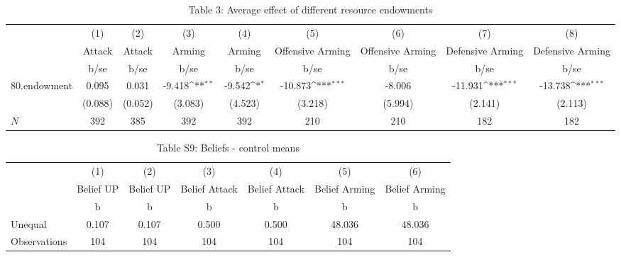 \begin{table}[htbp]\centering
\def\sym#1{\ifmmode^{#1}\else\(^{#1}\)\fi}
\caption{Table 3: Average effect of different resource endowments}
\begin{tabular}{l*{8}{c}}
\hline\hline
            &\multicolumn{1}{c}{(1)}&\multicolumn{1}{c}{(2)}&\multicolumn{1}{c}{(3)}&\multicolumn{1}{c}{(4)}&\multicolumn{1}{c}{(5)}&\multicolumn{1}{c}{(6)}&\multicolumn{1}{c}{(7)}&\multicolumn{1}{c}{(8)}\\
            &\multicolumn{1}{c}{Attack}&\multicolumn{1}{c}{Attack}&\multicolumn{1}{c}{Arming}&\multicolumn{1}{c}{Arming}&\multicolumn{1}{c}{Offensive Arming}&\multicolumn{1}{c}{Offensive Arming}&\multicolumn{1}{c}{Defensive Arming}&\multicolumn{1}{c}{Defensive Arming}\\
            &        b/se         &        b/se         &        b/se         &        b/se         &        b/se         &        b/se         &        b/se         &        b/se         \\
\hline
80.endowment&       0.095         &       0.031         &      -9.418\sym{**} &      -9.542\sym{*}  &     -10.873\sym{***}&      -8.006         &     -11.931\sym{***}&     -13.738\sym{***}\\
            &     (0.088)         &     (0.052)         &     (3.083)         &     (4.523)         &     (3.218)         &     (5.994)         &     (2.141)         &     (2.113)         \\
\hline
\(N\)       &         392         &         385         &         392         &         392         &         210         &         210         &         182         &         182         \\
\hline\hline
\end{tabular}
\end{table}
\begin{table}[htbp]\centering
\def\sym#1{\ifmmode^{#1}\else\(^{#1}\)\fi}
\caption{Table S9: Beliefs - control means}
\begin{tabular}{l*{6}{c}}
\hline\hline
                    &\multicolumn{1}{c}{(1)}&\multicolumn{1}{c}{(2)}&\multicolumn{1}{c}{(3)}&\multicolumn{1}{c}{(4)}&\multicolumn{1}{c}{(5)}&\multicolumn{1}{c}{(6)}\\
                    &\multicolumn{1}{c}{Belief UP}&\multicolumn{1}{c}{Belief UP}&\multicolumn{1}{c}{Belief Attack}&\multicolumn{1}{c}{Belief Attack}&\multicolumn{1}{c}{Belief Arming}&\multicolumn{1}{c}{Belief Arming}\\
                    &           b&           b&           b&           b&           b&           b\\
\hline
Unequal             &       0.107&       0.107&       0.500&       0.500&      48.036&      48.036\\
\hline
Observations        &         104&         104&         104&         104&         104&         104\\
\hline\hline
\end{tabular}
\end{table}
